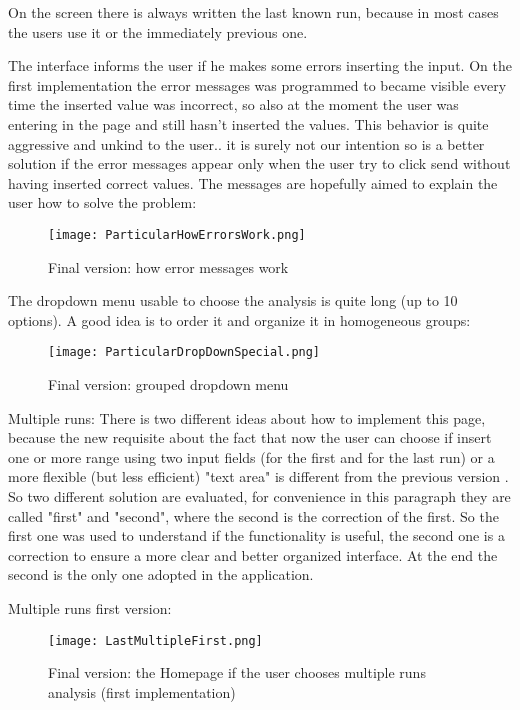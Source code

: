 On the screen there is always written the last known run, because in most cases the users use it or the immediately previous one. 

The interface informs the user if he makes some errors inserting the input. On the first implementation the error messages was programmed to became visible every time the inserted value was incorrect, so also at the moment the user was entering in the page and still hasn't inserted the values. This behavior is quite aggressive and unkind to the user.. it is surely not our intention so is a better solution if the error messages appear only when the user try to click send without having inserted correct values. The messages are hopefully aimed to explain the user how to solve the problem:

\begin{figure}[H]
\centering
\texttt{[image: ParticularHowErrorsWork.png]} 
\caption{Final version: how error messages work}
\end{figure}    


\newpage
The dropdown menu usable to choose the analysis is quite long (up to 10 options). A good idea is to order it and organize it in homogeneous groups:

\begin{figure}[H]
\centering
\texttt{[image: ParticularDropDownSpecial.png]} 
\caption{Final version: grouped dropdown menu}
\end{figure}    

  
Multiple runs:  
There is two different ideas about how to implement this page, because the new requisite about the fact that now the user can choose if insert one or more range using two input fields (for the first and for the last run) or a more flexible (but less efficient) "text area" is different from the previous version . So two different solution are evaluated, for convenience in this paragraph they are called "first" and "second", where the second is the correction of the first. So the first one was used to understand if the functionality is useful, the second one is a correction to ensure a more clear and better organized interface. At the end the second is the only one adopted in the application.

\newpage

Multiple runs first version:
\begin{figure}[H]
\centering
\texttt{[image: LastMultipleFirst.png]} 
\caption{Final version: the Homepage if the user chooses multiple runs analysis (first implementation)}
\end{figure}    

